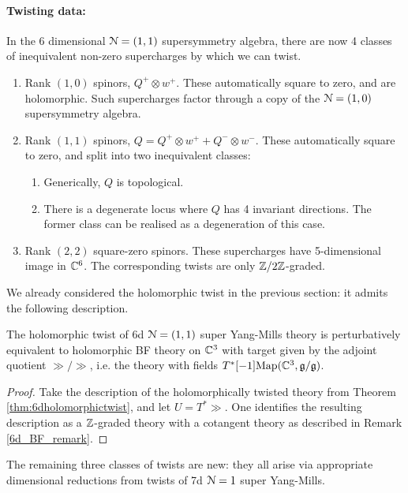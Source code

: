 \documentclass[10pt, oneside]{article}
\begin{document}
\vspace{-10pt}
\paragraph{Twisting data:}
In the 6 dimensional $\mathcal{N}=(1,1)$ supersymmetry algebra, there are now 4 classes of inequivalent non-zero supercharges by which we can twist.
\begin{enumerate}
 \item Rank $(1,0)$ spinors, $Q^+ \otimes w^+$.  These automatically square to zero, and are holomorphic.  Such supercharges factor through a copy of the $\mathcal{N}=(1,0)$ supersymmetry algebra.
 \item Rank $(1,1)$ spinors, $Q = Q^+ \otimes w^+ + Q^- \otimes w^-$.  These automatically square to zero, and split into two inequivalent classes:
 \begin{enumerate}
 \item Generically, $Q$ is topological.
 \item There is a degenerate locus where $Q$ has 4 invariant directions.  The former class can be realised as a degeneration of this case.
 \end{enumerate}
 \item Rank $(2,2)$ square-zero spinors.  These supercharges have 5-dimensional image in $\mathbb C^6$.  The corresponding twists are only $\mathbb Z/2\mathbb Z$-graded.
\end{enumerate}

We already considered the holomorphic twist in the previous section: it admits the following description.

\begin{theorem} \label{6d_holo_twist_thm}
The holomorphic twist of 6d $\mathcal{N}=(1,1)$ super Yang-Mills theory is perturbatively equivalent to holomorphic BF theory on $\mathbb C^3$ with target given by the adjoint quotient $\gg/\gg$, i.e. the theory with fields $T^*[-1]\mathrm{Map}(\mathbb C^3, \mathfrak{g}/\mathfrak{g})$.
\end{theorem}

\begin{proof}
Take the description of the holomorphically twisted theory from Theorem \ref{thm:6dholomorphictwist}, and let $U = T^*\gg$.  One identifies the resulting description as a $\mathbb Z$-graded theory with a cotangent theory as described in Remark \ref{6d_BF_remark}.
\end{proof}

The remaining three classes of twists are new: they all arise via appropriate dimensional reductions from twists of 7d $\mathcal{N}=1$ super Yang-Mills.
\end{document}
